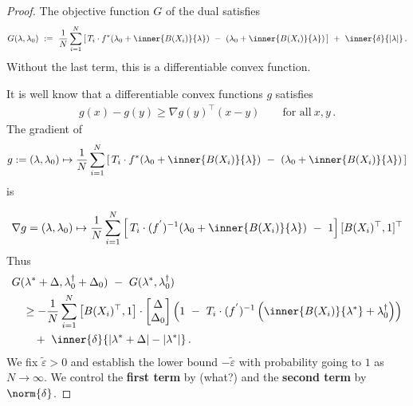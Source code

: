 \begin{proof}
  The objective function $G$ of the dual satisfies
\begin{gather*}
  G(\lambda,\lambda_0)
  \ 
  :=
  \ 
    \frac{1}{N}
\sum_{i=1} 
  ^N
  \left[ 
    \,
  T_i
  \cdot
  f^*
  \!
  \left( 
\lambda_0
+
\inner
{B(X_i)}
{\lambda}
  \right)
  \ 
-
\ 
  \left( 
\lambda_0
+
\inner
{B(X_i)}
{\lambda}
  \right)
  \,
  \right]
  \ 
+
\ 
\inner
{\delta}
{|\lambda|}
\,.
\end{gather*}
Without the last term, this is a differentiable convex function.

It is well know that a differentiable convex functions $g$ satisfies
  \begin{gather}
    \label{cv:ts:concD}
    g(x)-g(y)
    \ge
    \nabla
    g(y)^\top
    (x-y)
    \qquad 
    \text{for all}\ 
    x,y\,.
  \end{gather}
  The gradient of
  \begin{gather}
    g := 
    (\lambda,\lambda_0)
    \mapsto
    \frac{1}{N}
\sum_{i=1} 
  ^N
  \left[ 
    \,
  T_i
  \cdot
  f^*
  \!
  \left( 
\lambda_0
+
\inner
{B(X_i)}
{\lambda}
  \right)
  \ 
-
\ 
  \left( 
\lambda_0
+
\inner
{B(X_i)}
{\lambda}
  \right)
  \,
  \right]
  \end{gather}
  is 

  \begin{gather}
    \nabla
    g
    =
    (\lambda,\lambda_0)
    \mapsto
\frac{1}{N}
\sum_{i=1} 
  ^N
  \left[ 
    \,
  T_i
  \cdot
  (f^{'})^{-1}
  \!
  \left( 
\lambda_0
+
\inner
{B(X_i)}
{\lambda}
  \right)
  \ 
-
\ 
1
  \right]
  [
  B(X_i)^\top
  ,
  1
  ]^\top
  \end{gather}
  Thus
\begin{align}
  \label{c:1}
  \begin{split}
     &
   G
     (
     \lambda^*
      +
      \Delta
      ,
      \lambda^\dagger_0
      +
     \Delta_0
     )
     \ 
     -
     \ 
     G
     (
     \lambda^*,
      \lambda^\dagger_0
     )
     \\
     &
     \quad
     \ge
     -
     \frac{1}{N}
     \sum_{i=1}^{N} 
     \left[ 
       B(X_i)^\top,
       1
     \right]
     \cdot
     \begin{bmatrix}
       \Delta\\
       \Delta_0
     \end{bmatrix}
     \left( 
       1
       \ 
       -
       \ 
     T_i
     \cdot
     (f^{'})^{-1}
     \left( 
       \inner
       {B(X_i)}
       {\lambda^*}
       +
      \lambda^\dagger_0
     \right)
     \right)
     \\
     &
     \qquad
     +
     \ 
     \inner
     {\delta}
     {
       |\lambda^*+\Delta|
       -
       |\lambda^*|
     }
     \,.
   \end{split}
\end{align}
We fix $
\tilde{\varepsilon}
>0
$
and establish the lower bound
$
-
\tilde{\varepsilon}
$
with probability going to $1$ as $N\to\infty$.
We control the \textbf{first term} by (what?) 
and the \textbf{second term} by $\norm{\delta}$.

\end{proof}
